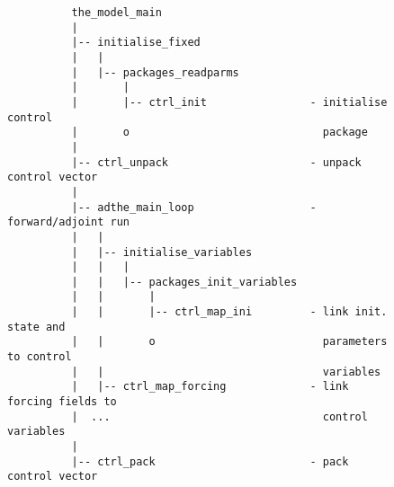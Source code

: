 \begin{figure}[h!]

{\scriptsize
\begin{verbatim}
          the_model_main
          |
          |-- initialise_fixed
          |   |
          |   |-- packages_readparms
          |       |
          |       |-- ctrl_init                - initialise control
          |       o                              package
          |
          |-- ctrl_unpack                      - unpack control vector
          |
          |-- adthe_main_loop                  - forward/adjoint run
          |   |
          |   |-- initialise_variables
          |   |   |
          |   |   |-- packages_init_variables
          |   |       |
          |   |       |-- ctrl_map_ini         - link init. state and
          |   |       o                          parameters to control 
          |   |                                  variables
          |   |-- ctrl_map_forcing             - link forcing fields to
          |  ...                                 control variables
          |
          |-- ctrl_pack                        - pack control vector
\end{verbatim}
}
\caption{~}
\label{fig:ctrlflow}
\end{figure}

